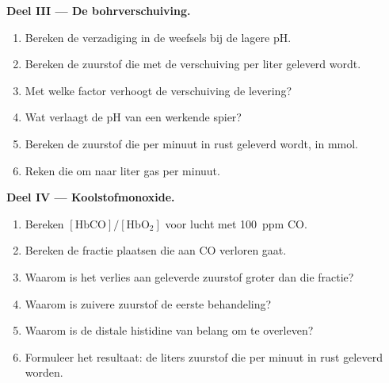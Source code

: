 \begin{problem}
\medskip\noindent\textbf{Deel III --- De bohrverschuiving.}
\begin{enumerate}[resume]
  \item Bereken de verzadiging in de weefsels bij de lagere pH.
  \item Bereken de zuurstof die met de verschuiving per liter geleverd
        wordt.
  \item Met welke factor verhoogt de verschuiving de levering?
  \item Wat verlaagt de pH van een werkende spier?
  \item Bereken de zuurstof die per minuut in rust geleverd wordt, in
        mmol.
  \item Reken die om naar liter gas per minuut.
\end{enumerate}

\medskip\noindent\textbf{Deel IV --- Koolstofmonoxide.}
\begin{enumerate}[resume]
  \item Bereken $[\mathrm{HbCO}]/[\mathrm{HbO_2}]$ voor lucht met \qty{100}{ppm} CO.
  \item Bereken de fractie plaatsen die aan CO verloren gaat.
  \item Waarom is het verlies aan geleverde zuurstof groter dan die
        fractie?
  \item Waarom is zuivere zuurstof de eerste behandeling?
  \item Waarom is de distale histidine van belang om te overleven?
  \item Formuleer het resultaat: de liters zuurstof die per minuut in rust
        geleverd worden.
\end{enumerate}
\end{problem}
